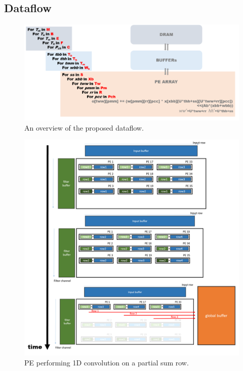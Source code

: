 \subsection{Dataflow}
\begin{figure}[h]
    \centering
    \includegraphics[width=1\linewidth]{inc/4_proposed_architecture/figure/dataflow.png}
    \caption{An overview of the proposed dataflow.}
    \label{fig:dataflow}
\end{figure}
\begin{figure}[h]
    \centering
    \includegraphics[width=1\linewidth]{inc/4_proposed_architecture/figure/pe_dataflow.png}
    \caption{PE performing 1D convolution on a partial sum row.}
    \label{fig:pe_dataflow}
\end{figure}
